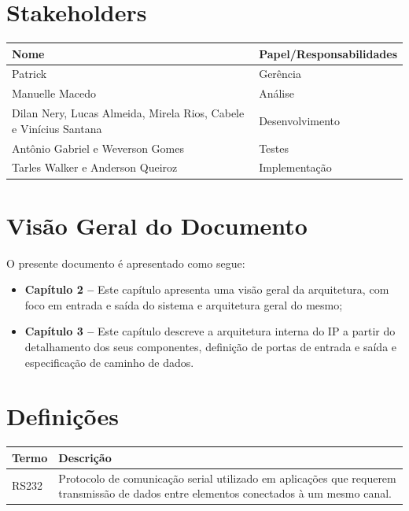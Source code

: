 \documentclass{report}
\begin{document}
  \section{Stakeholders}
    \FloatBarrier
    \begin{table}[H] 
      \begin{center}
        \begin{tabular}[pos]{|m{6cm} | m{8cm}|} 
          \hline 
          \cellcolor[gray]{0.9}\textbf{Nome} & \cellcolor[gray]{0.9}\textbf{Papel/Responsabilidades} \\ \hline  
           \hline Patrick 	& Gerência \\
           \hline Manuelle Macedo 	& Análise \\
           \hline Dilan Nery, Lucas Almeida, Mirela Rios, Cabele e Vinícius Santana	& Desenvolvimento \\
           \hline Antônio Gabriel e Weverson Gomes	& Testes       \\
           \hline Tarles Walker e Anderson Queiroz 	& Implementação \\ \hline
        \end{tabular}
      \end{center}
    \end{table} 

\section{Visão Geral do Documento}

O presente documento é apresentado como segue:

  \begin{itemize}
   \item \textbf{Capítulo 2 --} Este capítulo apresenta uma visão geral da arquitetura, com foco em entrada e saída do sistema e arquitetura geral do mesmo;
   \item \textbf{Capítulo 3 --} Este capítulo descreve a arquitetura interna do IP a partir do detalhamento dos seus componentes, definição de portas de entrada e saída e especificação de caminho de dados.
  \end{itemize}


  \section{Definições}
    \FloatBarrier
    \begin{table}[H]
      \begin{center}
        \begin{tabular}[pos]{|m{5cm} | m{9cm}|} 
          \hline
          \cellcolor[gray]{0.9}\textbf{Termo} & \cellcolor[gray]{0.9}\textbf{Descrição} \\ \hline
          RS232                & Protocolo de comunicação serial utilizado em aplicações que requerem transmissão de dados entre elementos conectados à um mesmo canal.                    \\ \hline
        \end{tabular}
      \end{center}
    \end{table}  
\end{document}
